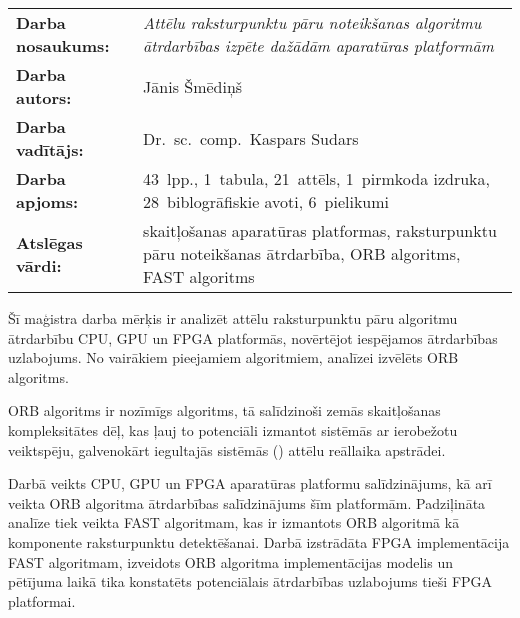 
\abstitlestyle{\abstractname} %
\noindent%
\begin{tabularx}{\textwidth}{lX}
	\textbf{Darba nosaukums:} & 
		\textit{Attēlu raksturpunktu pāru noteikšanas algoritmu
		        ātrdarbības izpēte dažādām aparatūras platformām}\\[1ex]
	\textbf{Darba autors:} & Jānis Šmēdiņš\\[1ex]
	\textbf{Darba vadītājs:} & Dr.~sc.~comp.~Kaspars Sudars\\[1ex]
	\textbf{Darba apjoms:} & 43~lpp., 1~tabula, 21~attēls, 1~pirmkoda izdruka,
	                         28~biblogrāfiskie avoti, 6~pielikumi\\[1ex]
	\textbf{Atslēgas vārdi:} & 
		skaitļošanas aparatūras platformas,
		raksturpunktu pāru noteikšanas ātrdarbība,
		ORB algoritms,
		FAST algoritms
\end{tabularx}

\vspace{1em}
Šī maģistra darba mērķis ir analizēt attēlu raksturpunktu pāru algoritmu
ātrdarbību CPU, GPU un FPGA platformās, novērtējot iespējamos
ātrdarbības uzlabojums. No vairākiem pieejamiem algoritmiem, analīzei
izvēlēts ORB algoritms.

ORB algoritms ir nozīmīgs algoritms, tā salīdzinoši zemās skaitļošanas
kompleksitātes dēļ, kas ļauj to potenciāli izmantot sistēmās ar ierobežotu
veiktspēju, galvenokārt iegultajās sistēmās ()
attēlu reāllaika apstrādei.

Darbā veikts CPU, GPU un FPGA aparatūras platformu salīdzinājums, kā arī
veikta ORB algoritma ātrdarbības salīdzinājums šīm platformām.
Padziļināta analīze tiek veikta FAST algoritmam,
kas ir izmantots ORB algoritmā kā komponente raksturpunktu detektēšanai.
Darbā izstrādāta FPGA implementācija FAST algoritmam, izveidots
ORB algoritma implementācijas modelis un 
pētījuma laikā tika konstatēts potenciālais
ātrdarbības uzlabojums tieši FPGA platformai.






